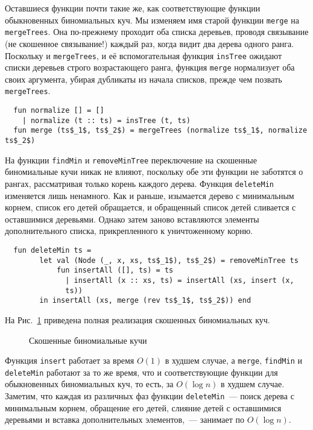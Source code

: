 Оставшиеся функции почти такие же, как соответствующие функции
обыкновенных биномиальных куч. Мы изменяем имя старой функции
\lstinline!merge! на \lstinline!mergeTrees!. Она по-прежнему проходит
оба списка деревьев, проводя связывание (не скошенное связывание!)
каждый раз, когда видит два дерева одного ранга. Поскольку и
\lstinline!mergeTrees!, и её вспомогательная функция
\lstinline!insTree! ожидают списки деревьев строго возрастающего
ранга, функция \lstinline!merge! нормализует оба своих аргумента,
убирая дубликаты из начала списков, прежде чем позвать
\lstinline!mergeTrees!.
\begin{lstlisting}
  fun normalize [] = []
    | normalize (t :: ts) = insTree (t, ts)
  fun merge (ts$_1$, ts$_2$) = mergeTrees (normalize ts$_1$, normalize ts$_2$)
\end{lstlisting}
На функции \lstinline!findMin! и \lstinline!removeMinTree!
переключение на скошенные биномиальные кучи никак не влияют, поскольку
обе эти функции не заботятся о рангах, рассматривая только корень
каждого дерева. Функция \lstinline!deleteMin! изменяется лишь
ненамного. Как и раньше, изымается дерево с минимальным корнем, список
его детей обращается, и обращенный список детей сливается с
оставшимися деревьями.  Однако затем заново вставляются элементы
дополнительного списка, прикрепленного к уничтоженному корню.
\begin{lstlisting}
  fun deleteMin ts =
        let val (Node (_, x, xs, ts$_1$), ts$_2$) = removeMinTree ts
            fun insertAll ([], ts) = ts
              | insertAll (x :: xs, ts) = insertAll (xs, insert (x,
              ts))
        in insertAll (xs, merge (rev ts$_1$, ts$_2$)) end
\end{lstlisting}
На Рис.~\ref{fig:9.8} приведена полная реализация скошенных
биномиальных куч.

\begin{figure}
  \centering
  
  \caption{Скошенные биномиальные кучи}
  \label{fig:9.8}
\end{figure}

Функция \lstinline!insert! работает за время $O(1)$ в худшем случае, а
\lstinline!merge!, \lstinline!findMin! и \lstinline!deleteMin!
работают за то же время, что и соответствующие функции для
обыкновенных биномиальных куч, то есть, за $O(\log n)$ в худшем
случае. Заметим, что каждая из различных фаз функции \lstinline!deleteMin!~---
поиск дерева с минимальным корнем, обращение его детей, слияние детей
с оставшимися деревьями и вставка дополнительных элементов,~---
занимает по $O(\log n)$.

